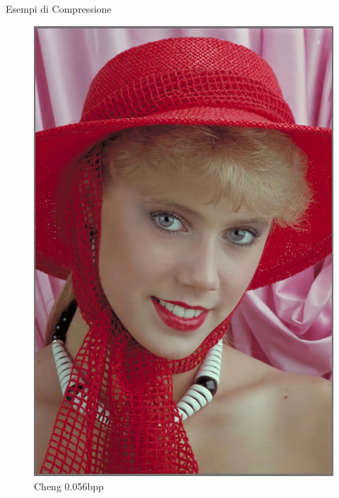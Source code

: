 \begin{frame}{Esempi di Compressione}
\begin{figure}[!ht]
\begin{minipage}[]{0.13\linewidth}
                \includegraphics[width=\textwidth]{Immagini/IMAGES/cheng2020_attn_2_IMG0004.pdf}
                \caption{Cheng 0.056bpp}
                \label{fig:ExampleCheng}
            \end{minipage}
            \label{fig:ExamplesCompression}
        \end{figure}
    \end{frame}


